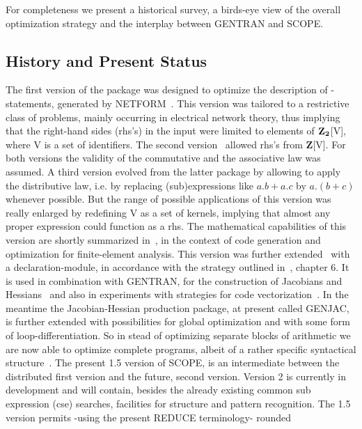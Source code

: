For completeness we present a historical survey, a birds-eye view of the
overall optimization strategy and the interplay between GENTRAN and SCOPE.

\subsection{History and Present Status}\label{SCOPE:hito}

The first version of the package was designed to optimize the
description of {\REDUCE}-statements, generated by
NETFORM~\cite{Smit:81,Smit:82}. This
version was tailored to a restrictive class of problems, mainly occurring
in electrical network theory, thus implying that the right-hand
sides (rhs's) in the input were limited to elements of ${\rm {\bf Z_2}}$[V],
where V is a set of identifiers.  The second version~\cite{vanHulzen:83}
allowed rhs's from {\bf Z}[V]. For both versions the validity of the
commutative and the associative law was assumed.  A third version
evolved from the latter package by allowing to apply the distributive
law, i.e. by replacing (sub)expressions like $a.b  +  a.c$ by $a.(b
+  c)$ whenever possible.  But the range of possible applications of
this version was really enlarged by redefining V as a set of kernels,
implying that almost any proper {\REDUCE}
expression could function as a rhs.  The mathematical capabilities of
this version are shortly summarized in~\cite{Wang:84}, in the context of code
generation and optimization for finite-element analysis. This version
was further extended~\cite{vanHulzen:89} with a declaration-module,
in accordance with the strategy outlined in~\cite{Aho:86}, chapter 6.
It is used 
in combination with GENTRAN, for
the construction of Jacobians and Hessians~\cite{Heuvel:89,Berger:92} and
also in experiments with strategies for code vectorization~\cite{Goldman:89}.
In the meantime the Jacobian-Hessian production package, at present
called GENJAC, is further extended with possibilities for global optimization
and with some form of loop-differentiation. So in stead of optimizing
separate blocks of arithmetic we are now able to optimize complete programs,
albeit of a rather specific syntactical structure~\cite{Berger:92}.
The present 1.5 version of SCOPE, is an intermediate between the distributed first
version and the future, second version.  Version 2 is currently in
development and will contain, besides the already existing common sub
expression (cse) searches, facilities for structure and pattern recognition.
The 1.5 version permits -using the present REDUCE terminology- rounded
